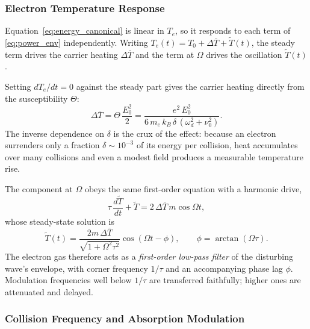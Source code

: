 \documentclass[12pt]{article}
\begin{document}
\subsubsection{Electron Temperature Response}

Equation~\eqref{eq:energy_canonical} is linear in $T_e$, so it responds to each term of
\eqref{eq:power_env} independently.  Writing
$T_e(t) = T_0 + \Delta\overline{T} + \widetilde{T}(t)$, the steady term drives the
carrier heating $\Delta\overline{T}$ and the term at $\Omega$ drives the oscillation
$\widetilde{T}(t)$.

Setting $dT_e/dt = 0$ against the steady part gives the carrier heating directly from the
susceptibility $\Theta$:
\begin{equation}
  \Delta\overline{T} = \Theta\,\frac{E_0^2}{2}
                     = \frac{e^2\,E_0^2}{6\,m_e\,k_B\,\delta\,(\omega_d^2+\nu_0^2)}.
  \label{eq:DT_steady}
\end{equation}
The inverse dependence on $\delta$ is the crux of the effect: because an electron surrenders
only a fraction $\delta \sim 10^{-3}$ of its energy per collision, heat accumulates over
many collisions and even a modest field produces a measurable temperature rise.

The component at $\Omega$ obeys the same first-order equation with a harmonic drive,
\begin{equation}
  \tau\,\frac{d\widetilde{T}}{dt} + \widetilde{T} = 2\,\Delta\overline{T}\,m\cos\Omega t,
\end{equation}
whose steady-state solution is
\begin{equation}
  \widetilde{T}(t) = \frac{2m\,\Delta\overline{T}}{\sqrt{1+\Omega^2\tau^2}}
    \cos(\Omega t - \phi),
  \qquad \phi = \arctan(\Omega\tau).
  \label{eq:T_osc}
\end{equation}
The electron gas therefore acts as a \emph{first-order low-pass filter} of the disturbing
wave's envelope, with corner frequency $1/\tau$ and an accompanying phase lag $\phi$.
Modulation frequencies well below $1/\tau$ are transferred faithfully; higher ones are
attenuated and delayed.

\subsubsection{Collision Frequency and Absorption Modulation}
\end{document}
